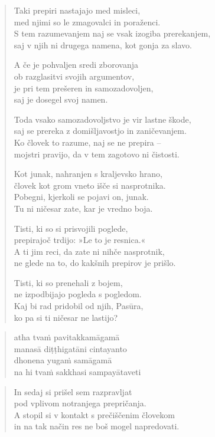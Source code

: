 \clearpage
\begin{verse}

Taki prepiri nastajajo med misleci,\\
med njimi so le zmagovalci in poraženci.\\
S tem razumevanjem naj se vsak izogiba prerekanjem,\\
saj v njih ni drugega namena, kot gonja za slavo.

A če je pohvaljen sredi zborovanja\\
ob razglasitvi svojih argumentov,\\
je pri tem prešeren in samozadovoljen,\\
saj je dosegel svoj namen.

Toda vsako samozadovoljstvo je vir lastne škode,\\
saj se prereka z domišljavostjo in zaničevanjem.\\
Ko človek to razume, naj se ne prepira --\\
mojstri pravijo, da v tem zagotovo ni čistosti.

Kot junak, nahranjen s kraljevsko hrano,\\
človek kot grom vneto išče si nasprotnika.\\
Pobegni, kjerkoli se pojavi on, junak.\\
Tu ni ničesar zate, kar je vredno boja.

Tisti, ki so si prisvojili poglede,\\
prepirajoč trdijo: »Le to je resnica.«\\
A ti jim reci, da zate ni nihče nasprotnik,\\
ne glede na to, do kakšnih prepirov je prišlo.

Tisti, ki so prenehali z bojem,\\
ne izpodbijajo pogleda s pogledom.\\
Kaj bi rad pridobil od njih, Pasūra,\\
ko pa si ti ničesar ne lastijo?

\end{verse}


\clearpage
\begin{verse}

atha tvaṁ pavitakkamāgamā\\
manasā diṭṭhigatāni cintayanto\\
dhonena yugaṁ samāgamā\\
na hi tvaṁ sakkhasi sampayātaveti

\end{verse}


\clearpage
\begin{verse}

In sedaj si prišel sem razpravljat\\
pod vplivom notranjega prepričanja.\\
A stopil si v kontakt s prečiščenim človekom\\
in na tak način res ne boš mogel napredovati.

\end{verse}
